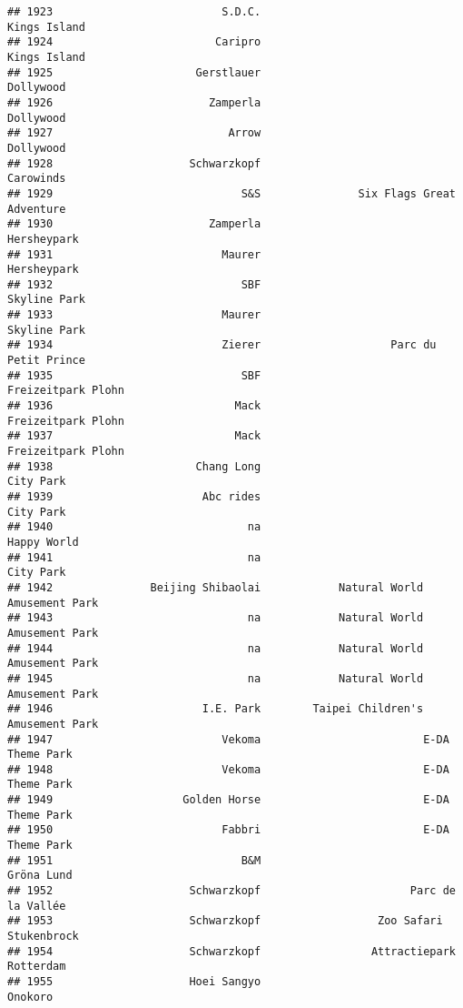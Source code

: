 \documentclass[
]{article}
\begin{document}
\begin{verbatim}
## 1923                          S.D.C.                            Kings Island
## 1924                         Caripro                            Kings Island
## 1925                      Gerstlauer                               Dollywood
## 1926                        Zamperla                               Dollywood
## 1927                           Arrow                               Dollywood
## 1928                     Schwarzkopf                               Carowinds
## 1929                             S&S               Six Flags Great Adventure
## 1930                        Zamperla                             Hersheypark
## 1931                          Maurer                             Hersheypark
## 1932                             SBF                            Skyline Park
## 1933                          Maurer                            Skyline Park
## 1934                          Zierer                    Parc du Petit Prince
## 1935                             SBF                      Freizeitpark Plohn
## 1936                            Mack                      Freizeitpark Plohn
## 1937                            Mack                      Freizeitpark Plohn
## 1938                      Chang Long                               City Park
## 1939                       Abc rides                               City Park
## 1940                              na                             Happy World
## 1941                              na                               City Park
## 1942               Beijing Shibaolai            Natural World Amusement Park
## 1943                              na            Natural World Amusement Park
## 1944                              na            Natural World Amusement Park
## 1945                              na            Natural World Amusement Park
## 1946                       I.E. Park        Taipei Children's Amusement Park
## 1947                          Vekoma                         E-DA Theme Park
## 1948                          Vekoma                         E-DA Theme Park
## 1949                    Golden Horse                         E-DA Theme Park
## 1950                          Fabbri                         E-DA Theme Park
## 1951                             B&M                              Gröna Lund
## 1952                     Schwarzkopf                       Parc de la Vallée
## 1953                     Schwarzkopf                  Zoo Safari Stukenbrock
## 1954                     Schwarzkopf                 Attractiepark Rotterdam
## 1955                     Hoei Sangyo                                 Onokoro

\end{verbatim}
\end{document}
